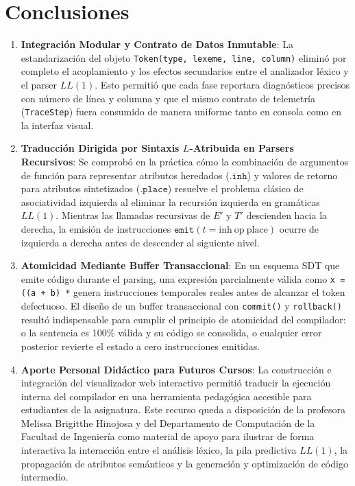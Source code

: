 \documentclass[11pt, letterpaper]{article}
\begin{document}
\section{Conclusiones}

\begin{enumerate}[leftmargin=1.8em]
    \item \textbf{Integración Modular y Contrato de Datos Inmutable}: La estandarización del objeto \texttt{Token(type, lexeme, line, column)} eliminó por completo el acoplamiento y los efectos secundarios entre el analizador léxico y el parser $LL(1)$. Esto permitió que cada fase reportara diagnósticos precisos con número de línea y columna y que el mismo contrato de telemetría (\texttt{TraceStep}) fuera consumido de manera uniforme tanto en consola como en la interfaz visual.
    \item \textbf{Traducción Dirigida por Sintaxis $L$-Atribuida en Parsers Recursivos}: Se comprobó en la práctica cómo la combinación de argumentos de función para representar atributos heredados ($\texttt{.inh}$) y valores de retorno para atributos sintetizados ($\texttt{.place}$) resuelve el problema clásico de asociatividad izquierda al eliminar la recursión izquierda en gramáticas $LL(1)$. Mientras las llamadas recursivas de $E'$ y $T'$ descienden hacia la derecha, la emisión de instrucciones $\texttt{emit}(t = \text{inh}\ \text{op}\ \text{place})$ ocurre de izquierda a derecha antes de descender al siguiente nivel.
    \item \textbf{Atomicidad Mediante Buffer Transaccional}: En un esquema SDT que emite código durante el parsing, una expresión parcialmente válida como \texttt{x = ((a + b) *} genera instrucciones temporales reales antes de alcanzar el token defectuoso. El diseño de un buffer transaccional con \texttt{commit()} y \texttt{rollback()} resultó indispensable para cumplir el principio de atomicidad del compilador: o la sentencia es 100\% válida y su código se consolida, o cualquier error posterior revierte el estado a cero instrucciones emitidas.
    \item \textbf{Aporte Personal Didáctico para Futuros Cursos}: La construcción e integración del visualizador web interactivo permitió traducir la ejecución interna del compilador en una herramienta pedagógica accesible para estudiantes de la asignatura. Este recurso queda a disposición de la profesora Melissa Brigitthe Hinojosa y del Departamento de Computación de la Facultad de Ingeniería como material de apoyo para ilustrar de forma interactiva la interacción entre el análisis léxico, la pila predictiva $LL(1)$, la propagación de atributos semánticos y la generación y optimización de código intermedio.
\end{enumerate}
\end{document}
